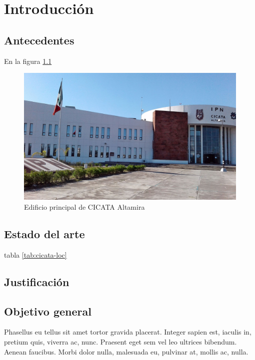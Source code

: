 \chapter{Introducción}
    \lipsum[1] \cite{rodriguez2022advances}

\section{Antecedentes} 
    En la figura \ref{fig:cicata edificio}  \lipsum[1]
    \begin{figure}
       \centering
        \includegraphics[width=1\textwidth]{src/images/cicata-alt-building.jpeg}
        \caption{Edificio principal de CICATA Altamira}
        \label{fig:cicata edificio}
    \end{figure}    

\section{Estado del arte}
    \lipsum[1] tabla \ref{tab:cicata-loc}

    \lipsum[2]
    
    
    \cite{garcia2024exploration} \lipsum[3]
    

\section{Justificación}
    \lipsum[1]

\section{Objetivo general}
    Phasellus eu tellus sit amet tortor gravida placerat. Integer sapien est, iaculis in, pretium quis, viverra ac, nunc. Praesent eget sem vel leo ultrices bibendum. Aenean faucibus. Morbi dolor nulla, malesuada eu, pulvinar at, mollis ac, nulla. 

